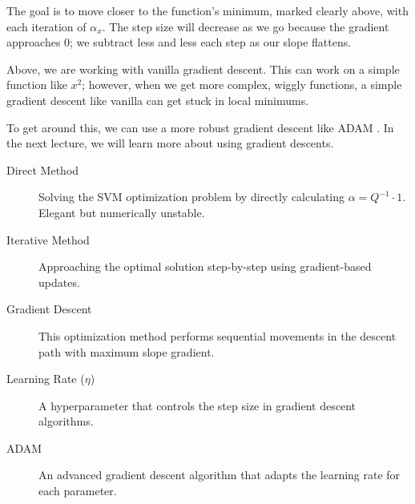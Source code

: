 The goal is to move closer to the function's minimum, marked clearly above, with each iteration of $\alpha_x$. The step size will decrease as we go because the gradient approaches $0$; we subtract less and less each step as our slope flattens. 

Above, we are working with vanilla gradient descent. This can work on a simple function like $x^2$; however, when we get more complex, wiggly functions, a simple gradient descent like vanilla can get stuck in local minimums.

To get around this, we can use a more robust gradient descent like ADAM \cite{kingma2014adam}. In the next lecture, we will learn more about using gradient descents. 

\begin{tcolorbox}[title=Key Terms \& Definitions, colback=gray!10, colframe=black, width=\textwidth]
\begin{description}
\item[Direct Method] Solving the SVM optimization problem by directly calculating $\alpha = Q^{-1} \cdot 1$. Elegant but numerically unstable.
\item[Iterative Method] Approaching the optimal solution step-by-step using gradient-based updates.
\item[Gradient Descent] This optimization method performs sequential movements in the descent path with maximum slope gradient.
\item[Learning Rate ($\eta$)] A hyperparameter that controls the step size in gradient descent algorithms.
\item[ADAM] An advanced gradient descent algorithm that adapts the learning rate for each parameter.
\end{description}
\end{tcolorbox}


